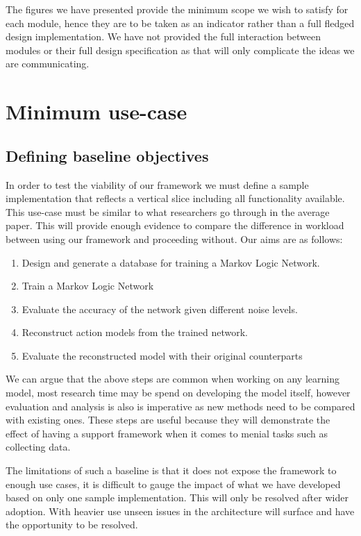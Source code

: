 The figures we have presented provide the minimum scope we wish to satisfy for each module, hence they are to be taken as an indicator rather than a full fledged design implementation. We have not provided the full interaction between modules or their full design specification as that will only complicate the ideas we are communicating.





\newpage
% 
\section{Minimum use-case}
\subsection{Defining baseline objectives}
In order to test the viability of our framework we must define a sample implementation that reflects a vertical slice including all functionality available. This use-case must be similar to what researchers go through in the average paper. This will provide enough evidence to compare the difference in workload between using our framework and proceeding without. Our aims are as follows: 
\begin{enumerate}
    \item Design and generate a database for training a Markov Logic Network.
    \item Train a Markov Logic Network
    \item Evaluate the accuracy of the network given different noise levels.
    \item Reconstruct action models from the trained network.
    \item Evaluate the reconstructed model with their original counterparts
\end{enumerate}
We can argue that the above steps are common when working on any learning model, most research time may be spend on developing the model itself, however evaluation and analysis is also is imperative as new methods need to be compared with existing ones. These steps are useful because they will demonstrate the effect of having a support framework when it comes to menial tasks such as collecting data.

The limitations of such a baseline is that it does not expose the framework to enough use cases, it is difficult to gauge the impact of what we have developed based on only one sample implementation. This will only be resolved after wider adoption. With heavier use unseen issues in the architecture will surface and have the opportunity to be resolved. 

